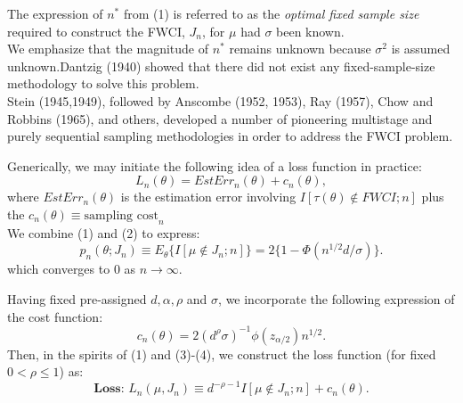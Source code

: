 \documentclass [xcolor=svgnames, t] {beamer}
\begin{document}
 \begin{frame}{}
  \vspace{7mm}

The expression of $n^*$ from (1) is referred to as the \textit{optimal fixed sample size} required to construct the FWCI, $J_n$, for $\mu$ had $\sigma$ been known. \\
\vspace{0.2cm}
We emphasize that the magnitude of $n^*$ remains unknown because $\sigma^2$ is assumed unknown.Dantzig (1940) showed that there did not exist any fixed-sample-size methodology to solve this problem.\\
\vspace{0.2cm}
Stein (1945,1949), followed by Anscombe (1952, 1953), Ray (1957), Chow and Robbins (1965), and
others, developed a number of pioneering multistage and purely sequential sampling
methodologies in order to address the FWCI problem.

\end{frame}
\begin{frame}{}
    \vspace{7mm}
    Generically, we may initiate the following idea of a loss function in practice:
        \begin{equation} \label{loss_fn}
            L_n(\theta)  = EstErr_n(\theta)+c_n(\theta),
        \end{equation}
        where $EstErr_n(\theta)$ is the estimation error involving $I \left[ {\tau(\theta) \not\in FWCI;n} \right]$ plus the $c_n(\theta) \equiv \text{sampling cost}_n$\\
        \vspace{2mm}
    We combine (1) and (2) to express:
        \begin{equation}
        p_n(\theta ;J_n) \equiv E_{\theta} \{ {I[ \mu \not\in J_n;n]}\} =2\{ 1-\Phi(n^{1/2}d/\sigma) \}.
        \end{equation}
        which converges to $0$ as $n \rightarrow \infty$.\\
        \vspace{0.1cm}
                
\end{frame}
\begin{frame}{}
\vspace{10mm}
Having fixed pre-assigned $d,\alpha,\rho$ and $\sigma$, we incorporate the following expression of the cost function:
        \begin{equation} \label{cost_fn}
        c_n(\theta) = 2(d^\rho \sigma)^{-1} \phi(z_{\alpha/2})n^{1/2}.
        \end{equation}
Then, in the spirits of (1) and (3)-(4), we construct the loss function (for fixed $0<\rho \le 1$) as:
        \begin{equation}
            \textbf{Loss: }L_n(\mu,J_n) \equiv d^{-\rho-1}I[\mu \not\in J_n;n]+c_n(\theta).
        \end{equation}

\end{frame}
\end{document}
